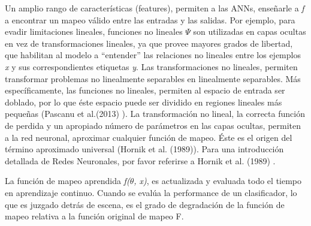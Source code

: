 Un amplio rango de características (features), permiten a las ANNs, enseñarle a \textit{f} a encontrar un mapeo válido entre las entradas y las salidas. Por ejemplo, para evadir limitaciones lineales, funciones no lineales $\Psi$ son utilizadas en capas ocultas en vez de transformaciones lineales, ya que provee mayores grados de libertad, que habilitan al modelo a ``entender'' las relaciones no lineales entre los ejemplos \textit{x} y sus correspondientes etiquetas \textit{y}. Las transformaciones no lineales, permiten transformar problemas no linealmente separables en linealmente separables. Más específicamente, las funciones no lineales, permiten al espacio de entrada ser doblado, por lo que éste espacio puede ser dividido en regiones lineales más pequeñas (Pascanu et al.(2013) \cite{pmlr-v28-pascanu13}). La transformación no lineal, la correcta función de perdida y un apropiado número de parámetros en las capas ocultas, permiten a la red neuronal, aproximar cualquier función de mapeo. Éste es el origen del término aproximado universal (Hornik et al. (1989)). Para una introducción detallada de Redes Neuronales, por favor referirse a Hornik et al. (1989) \cite{HORNIK1989359}.

La función de mapeo aprendida \textit{f($\theta$, x)}, es actualizada y evaluada todo el tiempo en aprendizaje continuo. Cuando se evalúa la performance de un clasificador, lo que es juzgado detrás de escena, es el grado de degradación de la función de mapeo relativa a la función original de mapeo F.




